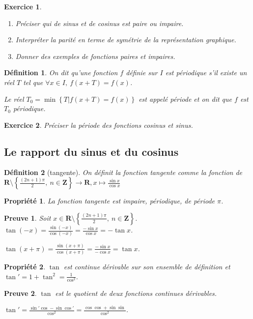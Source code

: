 \documentclass[11pt,a4paper,french]{article}
\newcommand{\R}{\mathbf{R}}
\newcommand{\Z}{\mathbf{Z}}
\theoremstyle{break}
\newtheorem{definition}{Définition}
\newtheorem{propriete}{Propriété}
\theoremstyle{plain}
\newtheorem{exerciceT}{Exercice}
\theoremstyle{nonumberplain}
\newtheorem{preuve}{Preuve}
\theoremstyle{nonumberbreak}
\newenvironment{exercice}{\begin{framed}\begin{exerciceT}}{\end{exerciceT}\end{framed}}
\begin{document}
\begin{exercice}
  \begin{enumerate}
    \item Préciser qui de sinus et de cosinus est paire ou impaire.
    \item Interpréter la parité en terme de symétrie de la
      représentation graphique.
    \item Donner des exemples de fonctions paires et impaires.
  \end{enumerate}
\end{exercice}

\begin{definition}
  On dit qu'une fonction $f$ définie sur $I$ est périodique s'il existe
  un réel $T$ tel que $\forall x \in I,\ f(x+T) = f(x)$.

  Le réel $T_0 = \min \left\{ T | f(x+T) = f(x) \right \}$ est appelé
  \emph{période} et on dit que $f$ est $T_0$ périodique.
\end{definition}

\begin{exercice}
  Préciser la période des fonctions cosinus et sinus.
\end{exercice}

\pagebreak

\subsection{Le rapport du sinus et du cosinus}

\begin{definition}[tangente]
  On définit la fonction tangente comme la fonction de $\R \setminus
  \left\{\frac{(2n+1)\pi}2,\ n\in\Z \right\}\to \R, x\mapsto \frac{\sin
  x}{\cos x}$
\end{definition}

\begin{propriete}
  La fonction tangente est impaire, périodique, de période $\pi$.
\end{propriete}
\begin{preuve}
  Soit $x \in \R \setminus \left\{\frac{(2n+1)\pi}2,\ n\in\Z \right\}$.
  $\tan(-x) = \frac{\sin(-x)}{\cos(-x)} = \frac{-\sin x}{\cos x} = -\tan
  x$.

  $\tan(x+\pi) = \frac{\sin(x + \pi)}{\cos(x + \pi)} = \frac{- \sin x}{-
  \cos x} = \tan x$.
\end{preuve}

\begin{propriete}
  $\tan$ est continue dérivable sur son ensemble de définition et $\tan'
  = 1 + \tan^2 = \frac1{\cos^2}$.
\end{propriete}
\begin{preuve}
  $\tan$ est le quotient de deux fonctions continues dérivables.

  $\tan' = \frac{\sin' \cos - \sin \cos'}{\cos^2} = \frac{\cos \cos +
  \sin \sin}{\cos^2}$.
\end{preuve}
\end{document}
